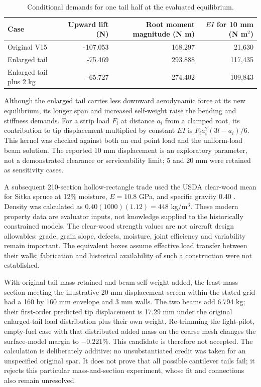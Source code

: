 \documentclass[10pt,letterpaper]{article}
\begin{document}
\begin{table}[htbp]\centering\small
\caption{Conditional demands for one tail half at the evaluated equilibrium.}
\label{tab:tail-beam-demand}
\begin{tabular}{lrrr}\toprule
Case & Upward lift (N) & Root moment magnitude (N m) & $EI$ for 10 mm (N m$^2$)\\\midrule
Original V15 & -107.053 & 168.297 & 21,630\\
Enlarged tail & -75.469 & 293.888 & 117,435\\
Enlarged tail plus 2 kg & -65.727 & 274.402 & 109,843\\\bottomrule
\end{tabular}\end{table}

Although the enlarged tail carries less downward aerodynamic force at its
new equilibrium, its longer span and increased self-weight raise the bending
and stiffness demands. For a strip load $F_i$ at distance $a_i$ from a clamped
root, its contribution to tip displacement multiplied by constant $EI$ is
$F_i a_i^2(3l-a_i)/6$. This kernel was checked against both an end point load
and the uniform-load beam solution. The reported 10 mm displacement is an
exploratory parameter, not a demonstrated clearance or serviceability limit;
5 and 20 mm were retained as sensitivity cases.

A subsequent 210-section hollow-rectangle trade used the USDA clear-wood
mean for Sitka spruce at 12\% moisture, $E=10.8$ GPa, and specific gravity
0.40 \cite{ref46}. Density was calculated as $0.40(1000)(1.12)=448$ kg/m$^3$.
These modern property data are evaluator inputs, not knowledge supplied to the
historically constrained models. The clear-wood strength values are not
aircraft design allowables: grade, grain slope, defects, moisture, joint
efficiency and variability remain important. The equivalent boxes assume
effective load transfer between their walls; fabrication and historical
availability of such a construction were not established.

With original tail mass retained and beam self-weight added, the least-mass
section meeting the illustrative 20 mm displacement screen within the stated
grid had a 160 by 160 mm envelope and 3 mm walls. The two beams add 6.794 kg;
their first-order predicted tip displacement is 17.29 mm under the original
enlarged-tail load distribution plus their own weight. Re-trimming the
light-pilot, empty-fuel case with that distributed added mass on the coarse
mesh changes the surface-model margin to $-0.221\%$. This candidate is therefore
not accepted. The calculation is deliberately additive: no unsubstantiated
credit was taken for an unspecified original spar. It does not prove that
all possible cantilever tails fail; it rejects this particular mass-and-section
experiment, whose fit and connections also remain unresolved.
\end{document}
